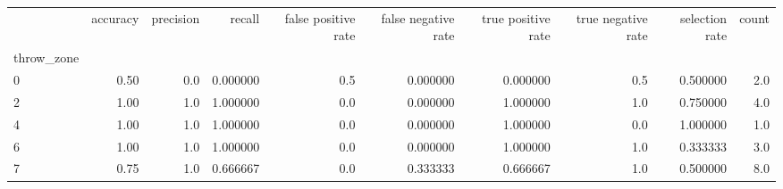 \begin{tabular}{lrrrrrrrrr}
\toprule
{} &  accuracy &  precision &    recall &  false positive rate &  false negative rate &  true positive rate &  true negative rate &  selection rate &  count \\
throw\_zone &           &            &           &                      &                      &                     &                     &                 &        \\
\midrule
0          &      0.50 &        0.0 &  0.000000 &                  0.5 &             0.000000 &            0.000000 &                 0.5 &        0.500000 &    2.0 \\
2          &      1.00 &        1.0 &  1.000000 &                  0.0 &             0.000000 &            1.000000 &                 1.0 &        0.750000 &    4.0 \\
4          &      1.00 &        1.0 &  1.000000 &                  0.0 &             0.000000 &            1.000000 &                 0.0 &        1.000000 &    1.0 \\
6          &      1.00 &        1.0 &  1.000000 &                  0.0 &             0.000000 &            1.000000 &                 1.0 &        0.333333 &    3.0 \\
7          &      0.75 &        1.0 &  0.666667 &                  0.0 &             0.333333 &            0.666667 &                 1.0 &        0.500000 &    8.0 \\
\bottomrule
\end{tabular}

